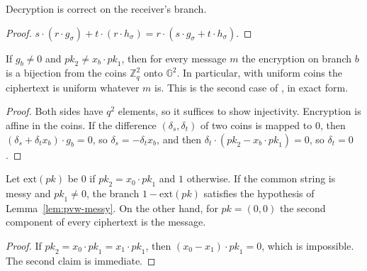 \begin{lemma}[Correctness]
  \label{lem:pvw-dec}
  \leanok
  Decryption is correct on the receiver's branch.
\end{lemma}

\begin{proof}
  \leanok
  $s \cdot (r \cdot g_\sigma) + t \cdot (r \cdot h_\sigma) = r \cdot (s \cdot g_\sigma + t \cdot h_\sigma)$.
\end{proof}

\begin{lemma}
  \label{lem:pvw-messy}
  \leanok
  If $g_b \neq 0$ and $\mathit{pk}_2 \neq x_b \cdot \mathit{pk}_1$, then for every message $m$
  the encryption on branch $b$ is a bijection from the coins $\mathbb{Z}_q^2$ onto
  $\mathbb{G}^2$. In particular, with uniform coins the ciphertext is uniform whatever $m$ is. This
  is the second case of \cite[Lemma~5.1]{PVW08}, in exact form.
\end{lemma}

\begin{proof}
  \leanok
  Both sides have $q^2$ elements, so it suffices to show injectivity. Encryption is affine in the
  coins. If the difference $(\delta_s, \delta_t)$ of two coins is mapped to $0$, then
  $(\delta_s + \delta_t x_b) \cdot g_b = 0$, so $\delta_s = -\delta_t x_b$, and then
  $\delta_t \cdot (\mathit{pk}_2 - x_b \cdot \mathit{pk}_1) = 0$, so $\delta_t = 0$.
\end{proof}

\begin{lemma}[Extraction]
  \label{lem:pvw-ext}
  \leanok
  Let $\mathrm{ext}(\mathit{pk})$ be $0$ if $\mathit{pk}_2 = x_0 \cdot \mathit{pk}_1$ and $1$
  otherwise. If the common string is messy and $\mathit{pk}_1 \neq 0$, the branch
  $1 - \mathrm{ext}(\mathit{pk})$ satisfies the hypothesis of Lemma~\ref{lem:pvw-messy}. On the
  other hand, for $\mathit{pk} = (0, 0)$ the second component of every ciphertext is the message.
\end{lemma}

\begin{proof}
  \leanok
  If $\mathit{pk}_2 = x_0 \cdot \mathit{pk}_1 = x_1 \cdot \mathit{pk}_1$, then
  $(x_0 - x_1) \cdot \mathit{pk}_1 = 0$, which is impossible. The second claim is immediate.
\end{proof}

